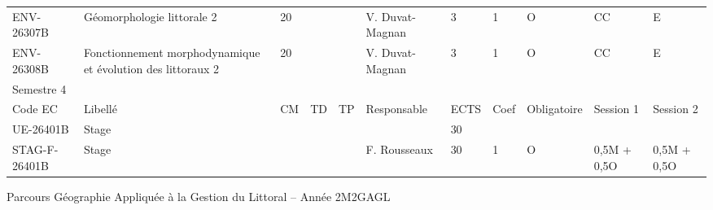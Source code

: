 \documentclass[a4paper,11pt]{article}
\begin{document}
{{\begin{tabular}{lllllllllll}
ENV-26307B                         & Géomorphologie littorale 2                                   & 20 &    &                           & V. Duvat-Magnan                    & 3    & 1    & O           & CC                                    & E                         \\
ENV-26308B                         & Fonctionnement morphodynamique et évolution des littoraux 2  & 20 &    &                           & V. Duvat-Magnan                    & 3    & 1    & O           & CC                                    & E                         \\
\rowcolor[HTML]{9B9B9B} 
Semestre 4                         &                                                              &    &    &                           &                                    &      &      &             &                                       &                           \\
\rowcolor[HTML]{C0C0C0} 
Code EC                            & Libellé                                                      & CM & TD & TP                        & Responsable                        & ECTS & Coef & Obligatoire & Session 1                             & Session 2                 \\
\rowcolor[HTML]{EFEFEF} 
UE-26401B                          & Stage                                                        &    &    &                           &                                    & 30   &      &             &                                       &                           \\
STAG-F-26401B                      & Stage                                                        &    &    &                           & F. Rousseaux                       & 30   & 1    & O           & 0,5M + 0,5O                           & 0,5M + 0,5O              
\end{tabular}}
}{Parcours Géographie Appliquée à la Gestion du Littoral -- Année 2}{M2GAGL}
\end{document}
